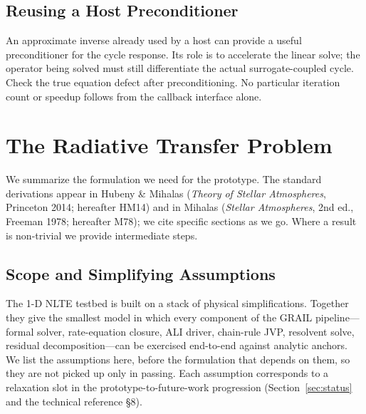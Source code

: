 \documentclass[11pt]{article}
\begin{document}
\subsection{Reusing a Host Preconditioner}
\label{sec:methodology-generalization}
An approximate inverse already used by a host can provide a useful
preconditioner for the cycle response. Its role is to accelerate the
linear solve; the operator being solved must still differentiate the
actual surrogate-coupled cycle. Check the true equation defect after
preconditioning. No particular iteration count or speedup follows from
the callback interface alone.


\section{The Radiative Transfer Problem}
\label{sec:rt-problem}

We summarize the formulation we need for the prototype.  The standard
derivations appear in Hubeny \& Mihalas (\textit{Theory of Stellar
Atmospheres}, Princeton 2014; hereafter HM14) and in Mihalas
(\textit{Stellar Atmospheres}, 2nd ed., Freeman 1978; hereafter
M78); we cite specific sections as we go.  Where a result is
non-trivial we provide intermediate steps.

\subsection{Scope and Simplifying Assumptions}
\label{sec:assumptions}

The 1-D NLTE testbed is built on a stack of physical simplifications.
Together they give the smallest model in which every component of the
GRAIL pipeline---formal solver, rate-equation closure, ALI driver,
chain-rule JVP, resolvent solve, residual decomposition---can be
exercised end-to-end against analytic anchors.  We list the
assumptions here, before the formulation that depends on them, so
they are not picked up only in passing.  Each assumption corresponds
to a relaxation slot in the prototype-to-future-work progression
(Section~\ref{sec:status} and the technical reference \S8).
\end{document}
